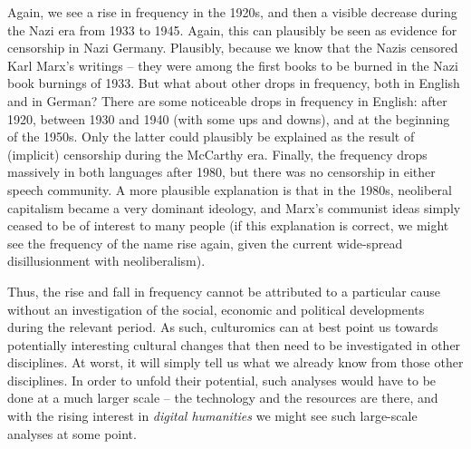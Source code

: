 Again, we see a rise in frequency  in the 1920s, and then a visible decrease during the Nazi era from 1933 to 1945. Again, this can plausibly be seen as evidence for censorship in Nazi Germany. Plausibly, because we know that the Nazis censored Karl Marx's writings -- they were among the first books to be burned in the Nazi book burnings of 1933. But what about other drops in frequency, both in English and in German? There are some noticeable drops in frequency in English: after 1920, between 1930 and 1940 (with some ups and downs), and at the beginning of the 1950s. Only the latter could plausibly be explained as the result of (implicit) censorship during the McCarthy era. Finally, the frequency  drops massively in both languages after 1980, but there was no censorship in either speech community. A more plausible explanation  is that in the 1980s, neoliberal capitalism became a very dominant ideology,  and Marx's communist ideas simply ceased to be of interest to many people (if this explanation is correct, we might see the frequency of the name rise again, given the current wide\hyp{}spread disillusionment with neoliberalism).

Thus, the rise and fall in frequency  cannot be attributed to a particular cause without an investigation of the social, economic and political developments during the relevant period. As such, culturomics  can at best point us towards potentially interesting cultural changes that then need to be investigated in other disciplines. At worst, it will simply tell us what we already know from those other disciplines. In order to unfold their potential, such analyses would have to be done at a much larger scale -- the technology and the resources are there, and with the rising interest in \textit{digital humanities}  we might see such large\hyp{}scale analyses at some point.

